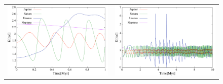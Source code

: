 \documentclass[11pt,a4paper,oneside,onecolumn]{jarticle}
\begin{document}
\begin{figure}[H]
\begin{tabular}{cc}
\begin{minipage}[t]{0.45\hsize}
\centering
\includegraphics[width=7.6cm]{./image/move500kyr_capitalOMEGA_1Myr.pdf}
\end{minipage} &
\begin{minipage}[t]{0.45\hsize}
\centering
\includegraphics[width=7.6cm]{./image/move500kyr_capitalOMEGA_10Myr.pdf}
\end{minipage}
%
\end{tabular}
\caption{\label{}}
\end{figure}
\end{document}
